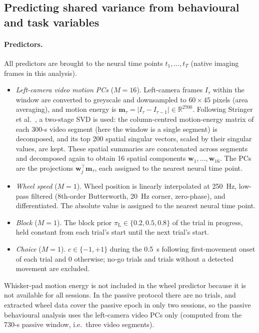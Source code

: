 \documentclass[11pt]{article}
\newcommand{\R}{\mathbb{R}}
\begin{document}
\subsection{Predicting shared variance from behavioural and task variables}

\paragraph{Predictors.} All predictors are brought to the neural time points $t_1, \dots, t_T$ (native imaging frames in this analysis).
\begin{itemize}
  \item \textit{Left-camera video motion PCs} ($M = 16$). Left-camera frames $I_\tau$ within the window are converted to greyscale and downsampled to $60 \times 45$ pixels (area averaging), and motion energy is $\mathbf{m}_\tau = |I_\tau - I_{\tau-1}| \in \R^{2700}$. Following Stringer et al.~\cite{stringer2019}, a two-stage SVD is used: the column-centred motion-energy matrix of each 300-s video segment (here the window is a single segment) is decomposed, and its top 200 spatial singular vectors, scaled by their singular values, are kept. These spatial summaries are concatenated across segments and decomposed again to obtain 16 spatial components $\mathbf{w}_1, \dots, \mathbf{w}_{16}$. The PCs are the projections $\mathbf{w}_j^{\top} \mathbf{m}_\tau$, each assigned to the nearest neural time point.
  \item \textit{Wheel speed} ($M = 1$). Wheel position is linearly interpolated at 250~Hz, low-pass filtered (8th-order Butterworth, 20~Hz corner, zero-phase), and differentiated. The absolute value is assigned to the nearest neural time point.
  \item \textit{Block} ($M = 1$). The block prior $\pi_{\mathrm{L}} \in \{0.2, 0.5, 0.8\}$ of the trial in progress, held constant from each trial's start until the next trial's start.
  \item \textit{Choice} ($M = 1$). $c \in \{-1, +1\}$ during the 0.5~s following first-movement onset of each trial and $0$ otherwise; no-go trials and trials without a detected movement are excluded.
\end{itemize}
Whisker-pad motion energy is not included in the wheel predictor because it is not available for all sessions. In the passive protocol there are no trials, and extracted wheel data cover the passive epoch in only two sessions, so the passive behavioural analysis uses the left-camera video PCs only (computed from the 730-s passive window, i.e.\ three video segments).
\end{document}
